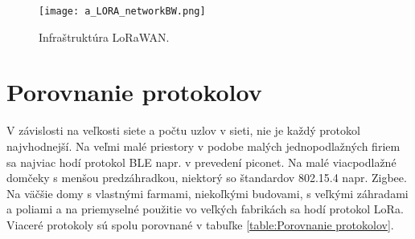 \documentclass[12pt,a4paper,oneside,openright]{report}
\begin{document}
\begin{figure*}[!htb]
	\centering
	\texttt{[image: a\_LORA\_networkBW.png]}
	\caption{Infraštruktúra LoRaWAN\cite{LoRa}.}
	\label{f:a_LoRa_Architecture}
\end{figure*}

\section{Porovnanie protokolov}
V závislosti na veľkosti siete a počtu uzlov v sieti, nie je každý protokol najvhodnejší. Na veľmi malé priestory v podobe malých jednopodlažných firiem sa najviac hodí protokol BLE napr. v prevedení piconet.
Na malé viacpodlažné domčeky s menšou predzáhradkou, niektorý so štandardov 802.15.4 napr. Zigbee.
Na väčšie domy s vlastnými farmami, niekoľkými budovami, s veľkými záhradami a poliami a na priemyselné použitie vo veľkých fabrikách sa hodí protokol LoRa.
Viaceré protokoly sú spolu porovnané v tabuľke \ref{table:Porovnanie protokolov}.

\begin{table}[h]
	\centering
	\caption{Porovnanie jednotlivých parametrov vybraných protokolov.}
	\label{table:Porovnanie protokolov}
\end{table}
\end{document}
